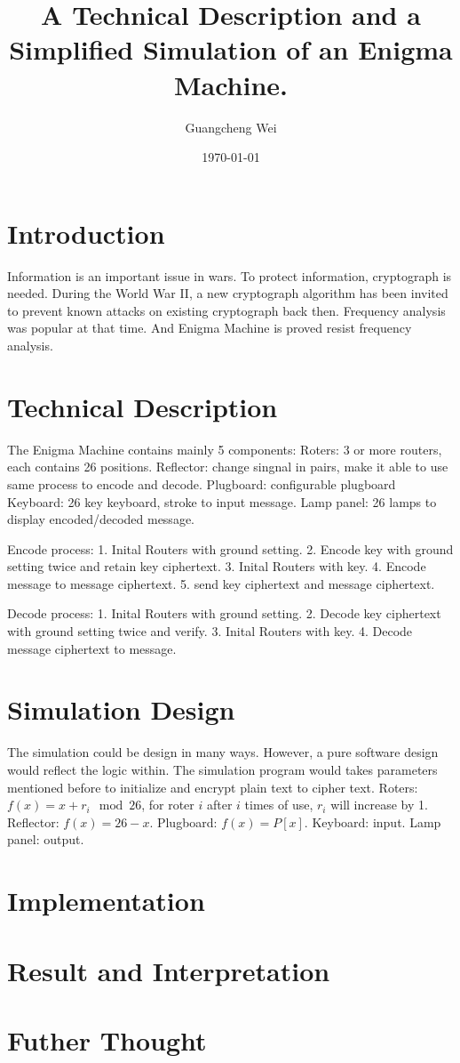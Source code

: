 \documentclass[11pt,twoside,a4paper]{article}
\begin{document}
\title{A Technical Description and a Simplified Simulation of an Enigma Machine.}
\author{Guangcheng Wei}
\date{\normalsize\today}
\maketitle

\section{Introduction}
Information is an important issue in wars. To protect information, cryptograph is needed.
During the World War II, a new cryptograph algorithm has been invited to prevent known attacks on existing cryptograph back then. Frequency analysis was popular at that time. And Enigma Machine is proved resist frequency analysis.\cite{wiki:Enigma}
\section{Technical Description}
The Enigma Machine contains mainly 5 components:
Roters: 3 or more routers, each contains 26 positions.
Reflector: change singnal in pairs, make it able to use same process to encode and decode.
Plugboard: configurable plugboard
Keyboard: 26 key keyboard, stroke to input message.
Lamp panel: 26 lamps to display encoded/decoded message.

Encode process:
1. Inital Routers with ground setting.
2. Encode key with ground setting twice and retain key ciphertext.
3. Inital Routers with key.
4. Encode message to message ciphertext.
5. send key ciphertext and message ciphertext.

Decode process:
1. Inital Routers with ground setting.
2. Decode key ciphertext with ground setting twice and verify.
3. Inital Routers with key.
4. Decode message ciphertext to message.

\section{Simulation Design}
The simulation could be design in many ways. However, a pure software design would reflect the logic within. The simulation program would takes parameters mentioned before to initialize and encrypt plain text to cipher text.
Roters: $f(x) = x + r_i \mod 26$, for roter $i$ after $i$ times of use, $r_i$ will increase by 1.
Reflector: $f(x) = 26 - x$.
Plugboard: $f(x) = P[x]$.
Keyboard: input.
Lamp panel: output.

\section{Implementation}
\section{Result and Interpretation}
\section{Futher Thought}

\nocite{*}

 
\end{document}
